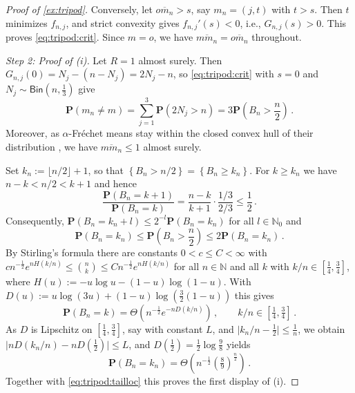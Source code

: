 \documentclass{article}
\newcommand*{\ms}[1]{\mathsf{#1}}
\newcommand{\N}{\mathbb{N}}
\newcommand{\lcb}{\left\lbrace} %
\newcommand{\rcb}{\right\rbrace} %
\newcommand{\cb}[1]{\lcb #1 \rcb} %
\newcommand{\lb}{\left(} %
\newcommand{\rb}{\right)} %
\newcommand{\br}[1]{\lb #1 \rb} %
\newcommand{\brOf}[1]{\!\br{#1}} %
\newcommand{\absof}[1]{\vert #1 \vert} %
\renewcommand{\Pr}{\mathbf{P}} %
\newcommand{\PrOf}[1]{\Pr\brOf{#1}}
\newcommand{\eqcm}{\,,} %
\newcommand{\eqfs}{\,.}
\newcommand{\ol}[2]{\overline{#1#2}}
\begin{document}
\begin{proof}[Proof of \cref{ex:tripod}]
    Conversely, let $\ol o{m_n}>s$, say $m_n = (j,t)$ with $t>s$. Then $t$ minimizes $f_{n,j}$, and strict convexity gives $f_{n,j}'(s)<0$, i.e., $G_{n,j}(s)>0$. This proves \eqref{eq:tripod:crit}. Since $m=o$, we have $\ol m{m_n} = \ol o{m_n}$ throughout.
    
    \emph{Step 2: Proof of (i).}
    Let $R=1$ almost surely. Then $G_{n,j}(0) = N_j - (n-N_j) = 2N_j-n$, so \eqref{eq:tripod:crit} with $s=0$ and $N_j\sim\ms{Bin}(n,\frac13)$ give
    \begin{equation}
        \PrOf{m_n\neq m}
        =
        \sum_{j=1}^3 \PrOf{2N_j > n}
        =
        3 \PrOf{B_n>\frac n2}
        \eqfs
    \end{equation}
    Moreover, as $\alpha$-Fr\'echet means stay within the closed convex hull of their distribution \cite[Proposition 5.2]{varinequ}, we have $\ol m{m_n}\leq1$ almost surely.
    
    Set $k_n := \lfloor n/2\rfloor +1$, so that $\cb{B_n>n/2} = \cb{B_n\geq k_n}$. For $k\geq k_n$ we have $n-k < n/2 < k+1$ and hence
    \begin{equation}\label{eq:tripod:ratio}
        \frac{\PrOf{B_n=k+1}}{\PrOf{B_n=k}}
        =
        \frac{n-k}{k+1}\cdot\frac{1/3}{2/3}
        \leq
        \frac12
        \eqfs
    \end{equation}
    Consequently, $\PrOf{B_n = k_n+l} \leq 2^{-l}\PrOf{B_n=k_n}$ for all $l\in\N_0$ and
    \begin{equation}\label{eq:tripod:tailloc}
        \PrOf{B_n=k_n}
        \leq
        \PrOf{B_n>\frac n2}
        \leq
        2 \PrOf{B_n=k_n}
        \eqfs
    \end{equation}
    By Stirling's formula there are constants $0<c\leq C<\infty$ with
    $c n^{-\frac12}e^{nH(k/n)} \leq \binom nk \leq C n^{-\frac12}e^{nH(k/n)}$
    for all $n\in\N$ and all $k$ with $k/n\in[\frac14,\frac34]$, where $H(u) := -u\log u - (1-u)\log(1-u)$. With $D(u) := u\log(3u) + (1-u)\log\br{\frac32(1-u)}$ this gives
    \begin{equation}
        \PrOf{B_n = k} = \Theta\brOf{n^{-\frac12}e^{-nD(k/n)}}
        \eqcm\qquad k/n\in\left[\tfrac14,\tfrac34\right]
        \eqfs
    \end{equation}
    As $D$ is Lipschitz on $[\frac14,\frac34]$, say with constant $L$, and $\absof{k_n/n - \frac12}\leq \frac1n$, we obtain $\absof{nD(k_n/n) - nD(\frac12)} \leq L$, and $D(\frac12) = \frac12\log\frac98$ yields
    \begin{equation}\label{eq:tripod:loc}
        \PrOf{B_n=k_n}
        =
        \Theta\brOf{n^{-\frac12}\br{\tfrac89}^{\frac n2}}
        \eqfs
    \end{equation}
    Together with \eqref{eq:tripod:tailloc} this proves the first display of (i).
    

\end{proof}
\end{document}
